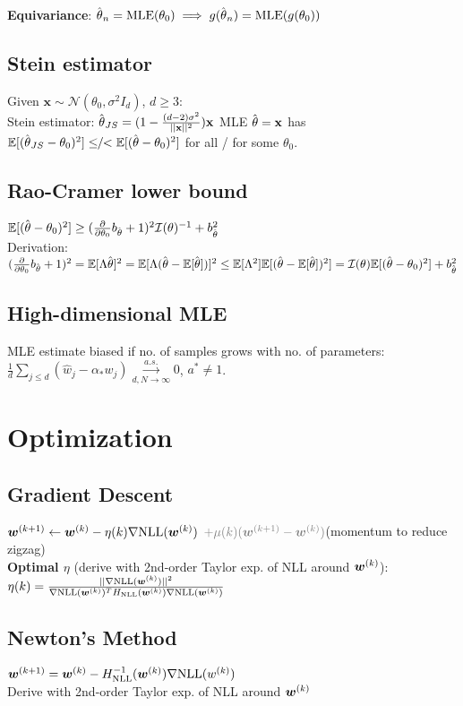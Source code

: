 \textbf{Equivariance}:
$\hat{\kern0pt \theta}_n = \textrm{MLE}(\theta_0) \implies g(\hat{\kern0pt \theta}_n) = \textrm{MLE}(g(\theta_0))$


\subsection*{Stein estimator}
Given $\mathbf{x} \sim \mathcal{N}(\theta_0, \sigma^2I_d)$, $d\geq3$:\\
Stein estimator: $\hat{\kern0pt \theta}_{JS} = (1-\frac{(d-2)\sigma^2}{||\mathbf{x}||^2})\mathbf{x}$
MLE $\hat{\kern0pt \theta} = \mathbf{x}$ has $\mathbb{E}[(\hat{\kern0pt \theta}_{JS} - \theta_0)^2] \leq\!\!/\!\!< \mathbb{E}[(\hat{\kern0pt \theta} - \theta_0)^2]$ for all / for some $\theta_0$.

% 
% 
\subsection*{Rao-Cramer lower bound}    
$\mathbb{E}[(\hat{\kern0pt \theta} - \theta_0)^2] \geq (\frac{\partial}{\partial\theta_0}b_{\hat{\kern0pt \theta}}+1)^2\mathcal{I}(\theta)^{-1} + b_{\hat{\kern0pt \theta}}^2$\\
Derivation: 
$(\frac{\partial}{\partial\theta_0}b_{\hat{\kern0pt \theta}}+1)^2 = 
 \mathbb{E}[\Lambda\hat{\kern0pt \theta}]^2 = \mathbb{E}[\Lambda(\hat{\kern0pt \theta} - \mathbb{E}[\hat{\kern0pt \theta}])]^2 \leq \mathbb{E}[\Lambda^2]\mathbb{E}[(\hat{\kern0pt \theta}-\mathbb{E}[\hat{\kern0pt \theta}])^2] = \mathcal{I}(\theta)\mathbb{E}[(\hat{\kern0pt \theta} - \theta_0)^2] + b_{\hat{\kern0pt \theta}}^2
$

\subsection*{High-dimensional MLE}
MLE estimate biased if no. of samples grows with no. of parameters:
$\frac{1}{d}\sum_{j\leq d}(\hat w_j-\alpha_* w_j)\overset{a.s.}{\underset{d,N\to\infty}{\to}}0$, $a^* \neq 1$.

\section*{Optimization}
\subsection*{Gradient Descent}
${\bm{w}}^{(k+1)} \leftarrow {\bm{w}}^{(k)} - \eta(k)\nabla\mathrm{NLL}({\bm{w}}^{(k)})$ {\color{gray}  $\color{gray}+ \mu(k)(\vw^{(k+1)} - \vw^{(k)})$}(momentum to reduce zigzag)\\
\textbf{Optimal $\eta$} (derive with 2nd-order Taylor exp. of NLL around ${\bm{w}}^{(k)}$):\\
$\eta(k)=\frac{||\nabla\mathrm{NLL}({\bm{w}}^{(k)})||^2}{\nabla\mathrm{NLL}({\bm{w}}^{(k)})^TH_{\mathrm{NLL}}({\bm{w}}^{(k)})\nabla\mathrm{NLL}({\bm{w}}^{(k)})}$

\subsection*{Newton's Method}
\mbox{${\bm{w}}^{(k+1)}={\bm{w}}^{(k)} - H_{\mathrm{NLL}}^{-1}({\bm{w}}^{(k)})\nabla\mathrm{NLL}(w^{(k)})$}\\
Derive with 2nd-order Taylor exp. of NLL around ${\bm{w}}^{(k)}$